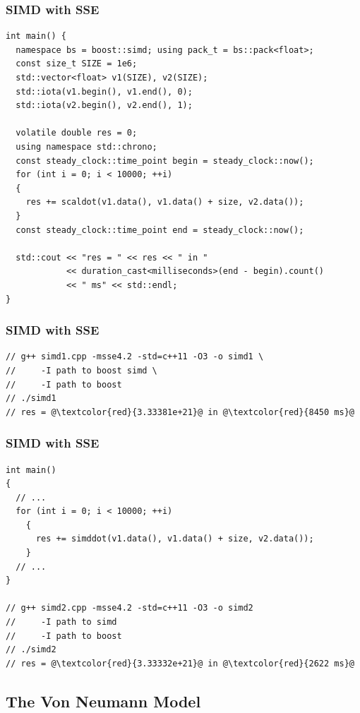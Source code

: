 \documentclass{beamer}
\begin{document}
\begin{frame}[fragile]
\frametitle{SIMD with SSE}
\scriptsize
\begin{lstlisting}[linebackgroundcolor={\lstcolorlines{4,13}}]
int main() {
  namespace bs = boost::simd; using pack_t = bs::pack<float>;
  const size_t SIZE = 1e6;
  std::vector<float> v1(SIZE), v2(SIZE);
  std::iota(v1.begin(), v1.end(), 0);
  std::iota(v2.begin(), v2.end(), 1);

  volatile double res = 0;
  using namespace std::chrono;
  const steady_clock::time_point begin = steady_clock::now();
  for (int i = 0; i < 10000; ++i)
  {
    res += scaldot(v1.data(), v1.data() + size, v2.data());
  }
  const steady_clock::time_point end = steady_clock::now();

  std::cout << "res = " << res << " in "
            << duration_cast<milliseconds>(end - begin).count()
            << " ms" << std::endl;
}
\end{lstlisting}

\end{frame}

\begin{frame}[fragile]
\frametitle{SIMD with SSE}
\scriptsize
\begin{lstlisting}
// g++ simd1.cpp -msse4.2 -std=c++11 -O3 -o simd1 \
//     -I path to boost simd \
//     -I path to boost
// ./simd1
// res = @\textcolor{red}{3.33381e+21}@ in @\textcolor{red}{8450 ms}@
\end{lstlisting}

\end{frame}

\begin{frame}[fragile]
\frametitle{SIMD with SSE}
\scriptsize
\begin{lstlisting}
int main()
{
  // ...
  for (int i = 0; i < 10000; ++i)
    {
      res += simddot(v1.data(), v1.data() + size, v2.data());
    }
  // ...
}

// g++ simd2.cpp -msse4.2 -std=c++11 -O3 -o simd2
//     -I path to simd
//     -I path to boost
// ./simd2
// res = @\textcolor{red}{3.33332e+21}@ in @\textcolor{red}{2622 ms}@
\end{lstlisting}

\end{frame}

\subsection{The Von Neumann Model}
\end{document}
